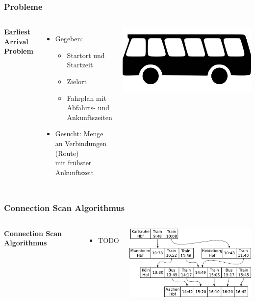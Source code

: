\documentclass[aspectratio=169]{beamer}
\begin{document}
\begin{frame}
\frametitle{Probleme}
\begin{columns}[c] %
	
	\textbf{Earliest Arrival Problem}
	\begin{itemize}
		\item Gegeben:
		\begin{itemize}
			\item Startort und Startzeit
			\item Zielort
			\item Fahrplan mit Abfahrts- und Ankunftszeiten
		\end{itemize}
		\item Gesucht: Menge an Verbindungen (Route) \\ mit frühster Ankunftszeit
	\end{itemize}
	\includegraphics[scale=0.2]{bus.png}	
\end{columns}
\end{frame}


\begin{frame}
\frametitle{Connection Scan Algorithmus}
\begin{columns}[c] %
	
	\textbf{Connection Scan Algorithmus}
	\begin{itemize}
		\item TODO
	\end{itemize}
	\includegraphics[scale=1]{train.pdf}
	
	
\end{columns}
\end{frame}

\end{document}
